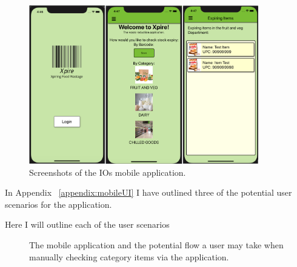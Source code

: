 \documentclass[a4paper,11pt]{report}
\begin{document}
\begin{figure}[H]
    \centering
    \includegraphics[width=10cm]{./assets/images/appUI.png}
    \caption{Screenshots of the IOs mobile application.}
    \label{fig:IOSScreenshots}
\end{figure}

In Appendix ~\ref{appendix:mobileUI} I have outlined three of the potential user scenarios for the application.

Here I will outline each of the user scenarios

\begin{figure}[H]
    \centering
    \caption{The mobile application and the potential flow a user may take when manually checking category items via the application.}
    \label{appendix:scenario1small}
\end{figure}
\end{document}
